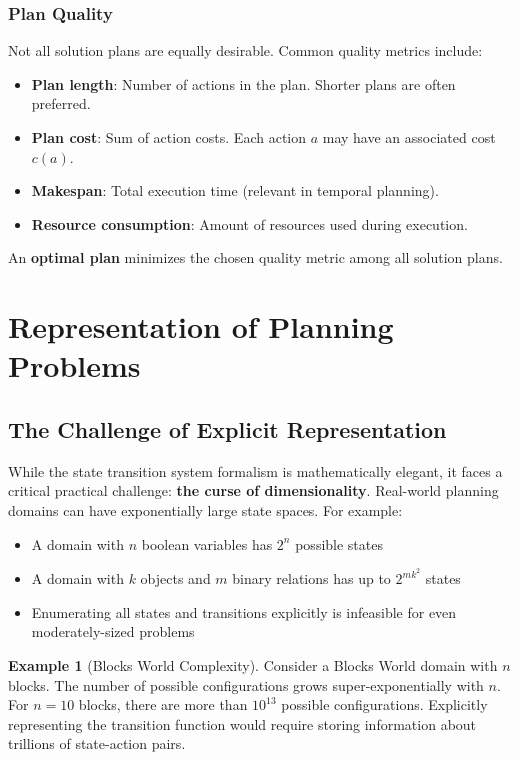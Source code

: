 \documentclass[11pt,a4paper]{article}
\theoremstyle{definition}
\newtheorem{example}{Example}[section]
\theoremstyle{plain}
\theoremstyle{remark}
\begin{document}
\subsubsection{Plan Quality}

Not all solution plans are equally desirable. Common quality metrics include:

\begin{itemize}
    \item \textbf{Plan length}: Number of actions in the plan. Shorter plans are often preferred.
    \item \textbf{Plan cost}: Sum of action costs. Each action $a$ may have an associated cost $c(a)$.
    \item \textbf{Makespan}: Total execution time (relevant in temporal planning).
    \item \textbf{Resource consumption}: Amount of resources used during execution.
\end{itemize}

An \textbf{optimal plan} minimizes the chosen quality metric among all solution plans.

\newpage

\section{Representation of Planning Problems}

\subsection{The Challenge of Explicit Representation}

While the state transition system formalism is mathematically elegant, it faces a critical practical challenge: \textbf{the curse of dimensionality}. Real-world planning domains can have exponentially large state spaces. For example:

\begin{itemize}
    \item A domain with $n$ boolean variables has $2^n$ possible states
    \item A domain with $k$ objects and $m$ binary relations has up to $2^{mk^2}$ states
    \item Enumerating all states and transitions explicitly is infeasible for even moderately-sized problems
\end{itemize}

\begin{example}[Blocks World Complexity]
Consider a Blocks World domain with $n$ blocks. The number of possible configurations grows super-exponentially with $n$. For $n=10$ blocks, there are more than $10^{13}$ possible configurations. Explicitly representing the transition function would require storing information about trillions of state-action pairs.
\end{example}
\end{document}
